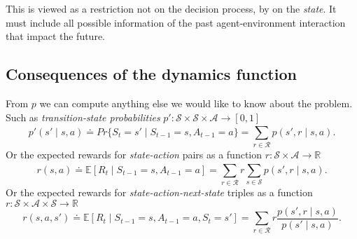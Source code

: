 

This is viewed as a restriction not on the decision process, by on the \textit{state}. It must include all possible information of the past agent-environment interaction that impact the future.

\subsection
{Consequences of the dynamics function}
From $p$ we can compute anything else we would like to know about the problem. Such as \textit{transition-state probabilities} $p': \mathcal{S}\times \mathcal{S}\times \mathcal{A} \rightarrow [0,1]$ 
\begin{equation}
\label{e.transstate}
    p'(s' \mid s,a) \doteq Pr \{S_t=s'  \mid S_{t-1}=s, A_{t-1}=a\} = \sum_{r\in \mathcal{R}}^{} p(s',r \mid s,a)
.\end{equation}
Or the expected rewards for \textit{state-action} pairs as a function $r: \mathcal{S}\times \mathcal{A} \rightarrow \mathbb{R}^{}$
\begin{equation}
\label{e.rew}
r(s,a) \doteq \mathbb{E} [R_t  \mid S_{t-1}=s, A_{t-1}=a ]= \sum_{r\in \mathcal{R}}^{} r \sum_{s\in \mathcal{S}}^{} p(s',r \mid s,a) 
.\end{equation}
Or the expected rewards for \textit{state-action-next-state} triples as a function $r: \mathcal{S}\times \mathcal{A}\times \mathcal{S}\to \mathbb{R}^{}$ 
\begin{equation}
    r(s,a,s') \doteq  \mathbb{E}[R_t  \mid S_{t-1}=s, A_{t-1}=a, S_t=s']
    = \sum_{r\in \mathcal{R}}^{} r \frac{p (s',r \mid s,a)}{p(s' \mid s,a)}
.\end{equation}


